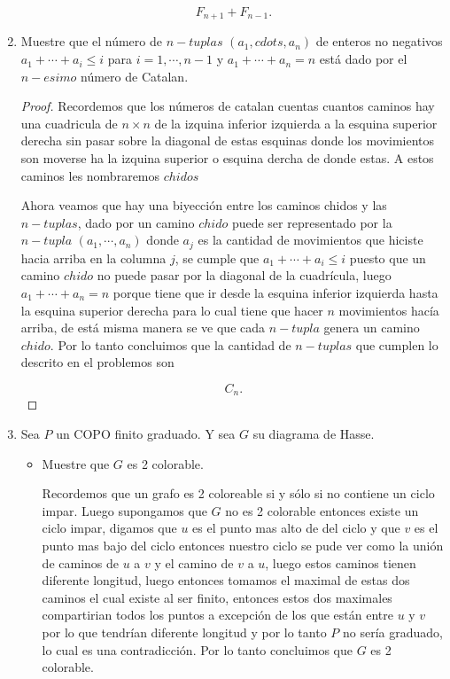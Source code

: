 \documentclass[letterpaper]{article}
\theoremstyle{definition}
\theoremstyle{lemathm}
\theoremstyle{lemademthm}
\newcommand{\pars}[1]{\left( #1 \right) }
\newcommand{\1}{\mathbbm{1}}
\begin{document}
\begin{enumerate}
		\[F_{n+1} + F_{n-1}.\]

		\item Muestre que el número de $n-tuplas$ $\pars{a_1,cdots,a_n}$ de enteros no negativos $a_1+\cdots+a_i \leq i$ para $i = 1,\cdots,n-1$ y $a_1+\cdots+a_n=n$ está dado por el $n-esimo$ número de Catalan. 
		
		\begin{proof}
			
			Recordemos que los números de catalan cuentas cuantos caminos hay una cuadricula de $n\times n$ de la izquina inferior izquierda a la esquina superior derecha sin pasar sobre la diagonal de estas esquinas donde los movimientos son moverse ha la izquina superior o esquina dercha de donde estas. A estos caminos les nombraremos $chidos$
	
			Ahora veamos que hay una biyección entre los caminos chidos y las $n-tuplas$, dado por un camino $chido$ puede ser representado por la $n-tupla$ $\pars{a_1,\cdots,a_n}$ donde $a_j$ es la cantidad de movimientos que hiciste hacia arriba en la columna $j$, se cumple que $a_1+\cdots+a_i\leq i$ puesto que un camino $chido$ no puede pasar por la diagonal de la cuadrícula, luego $a_1+\cdots+a_n=n$ porque tiene que ir desde la esquina inferior izquierda hasta la esquina superior derecha para lo cual tiene que hacer $n$ movimientos hacía arriba, de está misma manera se ve que cada $n-tupla$ genera un camino $chido$. Por lo tanto concluimos que la cantidad de $n-tuplas$ que cumplen lo descrito en el problemos son
	
			\[C_n.\]

		\end{proof}

		\item Sea $P$ un COPO finito graduado. Y sea $G$ su diagrama de Hasse.
		
		\begin{itemize}
			\item Muestre que $G$ es 2 colorable.
			
			Recordemos que un grafo es 2 coloreable si y sólo si no contiene un ciclo impar. Luego supongamos que $G$ no es 2 colorable entonces existe un ciclo impar, digamos que $u$ es el punto mas alto de del ciclo y que $v$ es el punto mas bajo del ciclo entonces nuestro ciclo se pude ver como la unión de caminos de $u$ a $v$ y el camino de $v$ a $u$, luego estos caminos tienen diferente longitud, luego entonces tomamos el maximal de estas dos caminos el cual existe al ser finito, entonces estos dos maximales compartirian todos los puntos a excepción de los que están entre $u$ y $v$ por lo que tendrían diferente longitud y por lo tanto $P$ no sería graduado, lo cual es una contradicción. Por lo tanto concluimos que $G$ es 2 colorable.


\end{itemize}
\end{enumerate}
\end{document}
